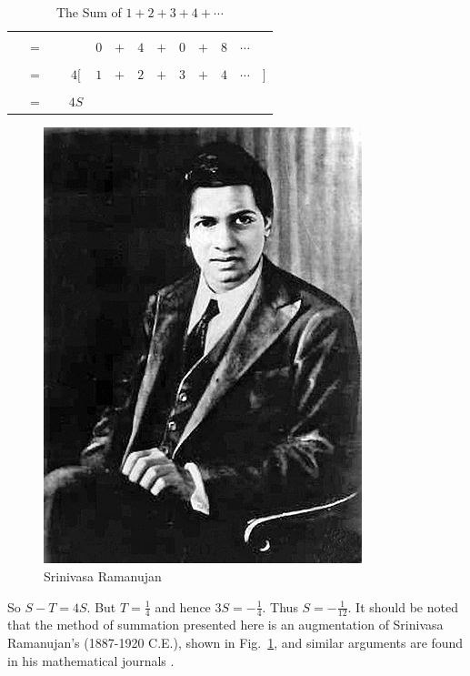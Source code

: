 \begin{example}
\begin{table}[H]
\begin{tabular}{ccccccccccccc}
                \\[1ex]
                \hline\\
                     &$=$&&&$0$&$+$&$4$&$+$&$0$&$+$&$8$&$\cdots$\\[1ex]
                \hline\\
                &$=$&&$4\Big[$&$1$&$+$&$2$&$+$&$3$&$+$&$4$&$\cdots$&$\Big]$
                    \\[1ex]
                \hline\\
                &$=$&&$4S$
            \end{tabular}
            \caption{The Sum of $1+2+3+4+\cdots$}
        \end{table}
        \begin{figure}
            \centering
            \captionsetup{type=figure}
            \includegraphics[scale=0.35]{images/SrinivasaRamanujanPre1920.jpg}
            \caption{Srinivasa Ramanujan}
            \label{photo:srinivasa_ramanujan}
        \end{figure}
        So $S-T=4S$. But $T=\frac{1}{4}$ and hence $3S=\minus\frac{1}{4}$.
        Thus $S=\minus\frac{1}{12}$. It should be noted that the method of
        summation presented here is an augmentation of
        Srinivasa Ramanujan's (1887-1920 C.E.),
        shown in Fig.~\ref{photo:srinivasa_ramanujan},
        and similar arguments are found in his mathematical journals
        \cite[Chapt.~VIII p.~3]{RamanujanNotebooksI}.
    \end{example}
